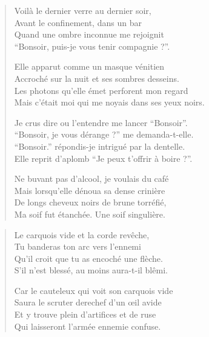 \begin{verse}\quatrain%
  Voilà le dernier verre au dernier soir,\\  
  Avant le confinement, dans un bar\\ 
  Quand une ombre inconnue me rejoignit\\ 
  \enquote{\newcharacterspeaks{}Bonsoir, puis-je vous tenir compagnie ?}. %

  Elle apparut  comme un masque vénitien\\ 
  Accroché sur la nuit et ses sombres desseins.\\ 
  Les photons qu’elle émet perforent mon regard\\ 
  Mais c’était moi qui me noyais dans ses yeux noirs. %

  Je crus dire ou l’entendre me lancer \enquote{\newcharacterspeaks{}Bonsoir}.\\ 
  \enquote{\newcharacterspeaks{}Bonsoir, je vous dérange ?} me demanda-t-elle.\\ 
  \enquote{\newcharacterspeaks{}Bonsoir.} répondis-je intrigué par la dentelle.\\ 
  Elle reprit d’aplomb \enquote{\newcharacterspeaks{}Je peux t’offrir à boire ?}. %

  Ne buvant pas d’alcool, je voulais du café\\ 
  Mais lorsqu’elle dénoua sa dense crinière\\ 
  De longs  cheveux noirs de brune torréfié,\\ 
  Ma soif fut étanchée. Une soif singulière. %
\end{verse}

\begin{verse}\quatrain
  Le carquois vide et la corde revêche,\\ 
  Tu banderas ton arc vers l’ennemi\\ 
  Qu’il croit que tu as encoché une flèche.\\ 
  S’il n’est blessé, au moins aura-t-il blêmi.  %

  Car le cauteleux qui voit son carquois vide\\ 
  Saura le scruter derechef d’un œil avide\\ 
  Et y trouve plein d’artifices et de ruse\\ 
  Qui laisseront l’armée ennemie confuse.  %
\end{verse}


